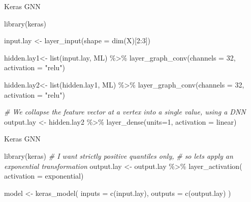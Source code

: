 \documentclass[
  ignorenonframetext,
]{beamer}
\newenvironment{Shaded}{\begin{snugshade}}{\end{snugshade}}
\newcommand{\AttributeTok}[1]{\textcolor[rgb]{0.77,0.63,0.00}{#1}}
\newcommand{\CommentTok}[1]{\textcolor[rgb]{0.56,0.35,0.01}{\textit{#1}}}
\newcommand{\DecValTok}[1]{\textcolor[rgb]{0.00,0.00,0.81}{#1}}
\newcommand{\FunctionTok}[1]{\textcolor[rgb]{0.00,0.00,0.00}{#1}}
\newcommand{\NormalTok}[1]{#1}
\newcommand{\OtherTok}[1]{\textcolor[rgb]{0.56,0.35,0.01}{#1}}
\newcommand{\SpecialCharTok}[1]{\textcolor[rgb]{0.00,0.00,0.00}{#1}}
\newcommand{\StringTok}[1]{\textcolor[rgb]{0.31,0.60,0.02}{#1}}
\begin{document}
\begin{frame}[fragile]{Keras GNN}
\protect\hypertarget{keras-gnn-1}{}
\begin{Shaded}
\begin{Highlighting}[]
\FunctionTok{library}\NormalTok{(keras)}

\NormalTok{input.lay }\OtherTok{\textless{}{-}} \FunctionTok{layer\_input}\NormalTok{(}\AttributeTok{shape =} \FunctionTok{dim}\NormalTok{(X)[}\DecValTok{2}\SpecialCharTok{:}\DecValTok{3}\NormalTok{])}

\NormalTok{hidden.lay1}\OtherTok{\textless{}{-}} \FunctionTok{list}\NormalTok{(input.lay, ML) }\SpecialCharTok{\%\textgreater{}\%} 
  \FunctionTok{layer\_graph\_conv}\NormalTok{(}\AttributeTok{channels =} \DecValTok{32}\NormalTok{,   }\AttributeTok{activation =} \StringTok{"relu"}\NormalTok{) }

\NormalTok{hidden.lay2}\OtherTok{\textless{}{-}} \FunctionTok{list}\NormalTok{(hidden.lay1, ML) }\SpecialCharTok{\%\textgreater{}\%} 
  \FunctionTok{layer\_graph\_conv}\NormalTok{(}\AttributeTok{channels =} \DecValTok{32}\NormalTok{,   }\AttributeTok{activation =} \StringTok{"relu"}\NormalTok{) }

\CommentTok{\# We collapse the feature vector at a vertex into a single value, using a DNN}
\NormalTok{output.lay }\OtherTok{\textless{}{-}}\NormalTok{ hidden.lay2 }\SpecialCharTok{\%\textgreater{}\%} \FunctionTok{layer\_dense}\NormalTok{(}\AttributeTok{units=}\DecValTok{1}\NormalTok{, }\AttributeTok{activation =} \StringTok{\textquotesingle{}linear\textquotesingle{}}\NormalTok{)}
\end{Highlighting}
\end{Shaded}
\end{frame}

\begin{frame}[fragile]{Keras GNN}
\protect\hypertarget{keras-gnn-2}{}
\begin{Shaded}
\begin{Highlighting}[]
\FunctionTok{library}\NormalTok{(keras)}
\CommentTok{\# I want strictly positive quantiles only, }
\CommentTok{\# so lets apply an exponential transformation}
\NormalTok{output.lay }\OtherTok{\textless{}{-}}\NormalTok{ output.lay }\SpecialCharTok{\%\textgreater{}\%}
  \FunctionTok{layer\_activation}\NormalTok{( }\AttributeTok{activation =} \StringTok{\textquotesingle{}exponential\textquotesingle{}}\NormalTok{)}

\NormalTok{ model }\OtherTok{\textless{}{-}} \FunctionTok{keras\_model}\NormalTok{(}
    \AttributeTok{inputs =} \FunctionTok{c}\NormalTok{(input.lay), }
    \AttributeTok{outputs =} \FunctionTok{c}\NormalTok{(output.lay)}
\NormalTok{  )}
\end{Highlighting}
\end{Shaded}
\end{frame}
\end{document}
